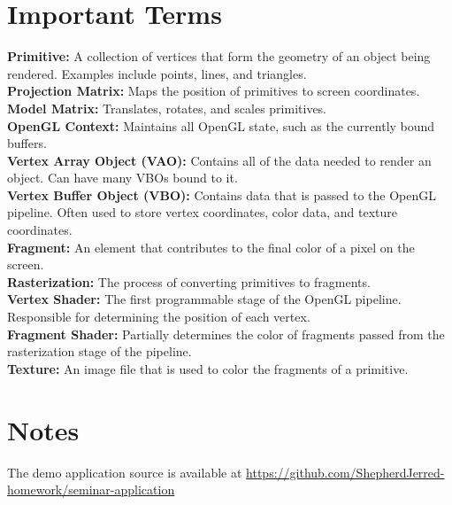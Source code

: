 \documentclass{article}
\begin{document}
  \section{Important Terms}
  \textbf{Primitive:}
  A collection of vertices that form the geometry of an object being rendered. Examples include points, lines, and triangles.
  \\
  \textbf{Projection Matrix:}
  Maps the position of primitives to screen coordinates.
  \\
  \textbf{Model Matrix:}
  Translates, rotates, and scales primitives.
  \\
  \textbf{OpenGL Context:}
  Maintains all OpenGL state, such as the currently bound buffers.
  \\
  \textbf{Vertex Array Object (VAO):}
  Contains all of the data needed to render an object. Can have many VBOs bound to it.
  \\
  \textbf{Vertex Buffer Object (VBO):}
  Contains data that is passed to the OpenGL pipeline. Often used to store vertex coordinates, color data, and texture coordinates.
  \\
  \textbf{Fragment:}
  An element that contributes to the final color of a pixel on the screen.
  \\
  \textbf{Rasterization:}
  The process of converting primitives to fragments.
  \\
  \textbf{Vertex Shader:}
  The first programmable stage of the OpenGL pipeline. Responsible for determining the position of each vertex.
  \\
  \textbf{Fragment Shader:}
  Partially determines the color of fragments passed from the rasterization stage of the pipeline.
  \\
  \textbf{Texture:}
  An image file that is used to color the fragments of a primitive.
  
  \section{Notes}
  The demo application source is available at \url{https://github.com/ShepherdJerred-homework/seminar-application}
  
  \clearpage
    
  \nocite{*}
  {}
  
  
\end{document}
